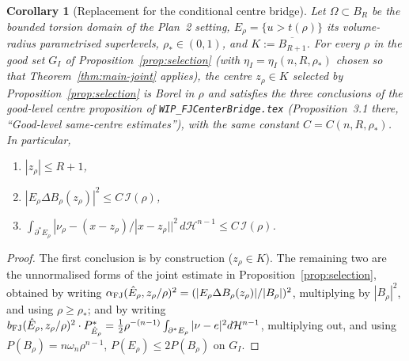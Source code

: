 \documentclass[11pt]{article}
\newtheorem{corollary}[theorem]{Corollary}
\theoremstyle{definition}
\newcommand{\Hn}{\mathcal H^{n-1}}
\newcommand{\rstar}{\rho_{*}}
\newcommand{\alphaFJ}{\alpha_{\rm FJ}}
\newcommand{\bFJ}{b_{\rm FJ}}
\begin{document}
\begin{corollary}[Replacement for the conditional centre bridge]
\label{cor:torsion-import}
Let \(\Omega\subset B_R\) be the bounded torsion domain of the Plan~2
setting, \(E_\rho=\{u>t(\rho)\}\) its volume-radius parametrised
superlevels, \(\rstar\in(0,1)\), and \(K:=\overline{B_{R+1}}\).  For
every \(\rho\) in the good set \(G_I\) of
Proposition~\ref{prop:selection} (with \(\eta_I=\eta_I(n,R,\rstar)\)
chosen so that
Theorem~\ref{thm:main-joint} applies), the centre \(z_\rho\in K\)
selected by Proposition~\ref{prop:selection} is Borel in \(\rho\) and
satisfies the three conclusions of the
good-level centre proposition of \texttt{WIP\_FJCenterBridge.tex}
(Proposition~3.1 there, ``Good-level same-centre estimates''), with
the same constant \(C=C(n,R,\rstar)\).  In particular,
\begin{enumerate}
\item \(|z_\rho|\le R+1\),
\item \(|E_\rho\Delta B_\rho(z_\rho)|^{2}\le C\,\mathcal I(\rho)\),
\item \(\int_{\partial^{\ast}E_\rho}
   |\nu_\rho-(x-z_\rho)/|x-z_\rho||^{2}\,d\Hn\le C\,\mathcal I(\rho)\).
\end{enumerate}
\end{corollary}

\begin{proof}
The first conclusion is by construction (\(z_\rho\in K\)).  The
remaining two are the unnormalised forms of the joint estimate in
Proposition~\ref{prop:selection}, obtained by writing
\(\alphaFJ(\hat E_\rho,z_\rho/\rho)^{2}=
   (|E_\rho\Delta B_\rho(z_\rho)|/|B_\rho|)^{2}\),
multiplying by \(|B_\rho|^{2}\), and using \(\rho\ge\rstar\); and by
writing \(\bFJ(\hat E_\rho,z_\rho/\rho)^{2}\cdot P_{\hat E_\rho}^{\ast}
   =\tfrac12\rho^{-(n-1)}\int_{\partial^{\ast}E_\rho}|\nu-e|^{2}d\Hn\),
multiplying out, and using \(P(B_\rho)=n\omega_n\rho^{n-1}\),
\(P(E_\rho)\le 2P(B_\rho)\) on \(G_I\).
\end{proof}
\end{document}
